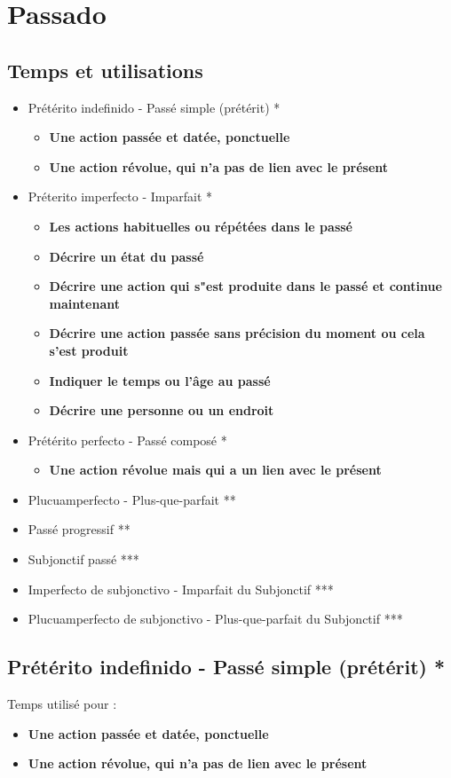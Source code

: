 \chapter{Passado}
\section{Temps et utilisations}
\begin{itemize}
    \item Prétérito indefinido - Passé simple (prétérit) *
    \begin{itemize}
        \item \textbf{Une action passée et datée, ponctuelle}
        \item \textbf{Une action révolue, qui n'a pas de lien avec le présent}
    \end{itemize}
    \item Préterito imperfecto - Imparfait *
    \begin{itemize}
        \item \textbf{Les actions habituelles ou répétées dans le passé}
        \item \textbf{Décrire un état du passé}
        \item \textbf{Décrire une action qui s"est produite dans le passé et continue maintenant}
        \item \textbf{Décrire une action passée sans précision du moment ou cela s'est produit}
        \item \textbf{Indiquer le temps ou l'âge au passé}
        \item \textbf{Décrire une personne ou un endroit}
    \end{itemize}
    \item Prétérito perfecto - Passé composé *
    \begin{itemize}
        \item \textbf{Une action révolue mais qui a un lien avec le présent}
    \end{itemize}
    \item Plucuamperfecto - Plus-que-parfait **
    \item Passé progressif **
    \item Subjonctif passé ***
    \item Imperfecto de subjonctivo - Imparfait du Subjonctif ***
    \item Plucuamperfecto de subjonctivo - Plus-que-parfait du Subjonctif ***
\end{itemize}
\newpage
\section{Prétérito indefinido - Passé simple (prétérit) *}
Temps utilisé pour : 
\begin{itemize}
    \item \textbf{Une action passée et datée, ponctuelle}
    \item \textbf{Une action révolue, qui n'a pas de lien avec le présent}
\end{itemize}
